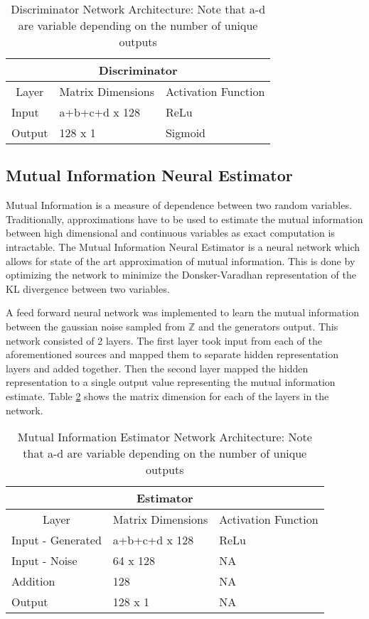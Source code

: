 \begin{table}[!htbp]
	\centering
	\label{tab:model_simple_b}
	\caption{Discriminator Network Architecture: Note that a-d are variable depending on the number of unique outputs}
	\begin{tabular}{l|l|l}
		\hline
		\multicolumn{3}{c}{\textbf{Discriminator}} \\ 
		\hline
		\multicolumn{1}{c|}{Layer} & \multicolumn{1}{c|}{Matrix Dimensions} & \multicolumn{1}{c}{Activation Function} \\ \hline
		Input & a+b+c+d x 128 & ReLu \\
		Output & 128 x 1 & Sigmoid \\
		\hline
	\end{tabular}
\end{table}


\subsection{Mutual Information Neural Estimator}
\label{sec:mine}
Mutual Information is a measure of dependence between two random variables. Traditionally, approximations have to be used to estimate the mutual information between high dimensional and continuous variables as exact computation is intractable. The Mutual Information Neural Estimator is a neural network which allows for state of the art approximation of mutual information. This is done by optimizing the network to minimize the Donsker-Varadhan representation of the KL divergence between two variables. 

A feed forward neural network was implemented to learn the mutual information between the gaussian noise sampled from $\mathbb{Z}$ and the generators output. This network consisted of 2 layers. The first layer took input from each of the aforementioned sources and mapped them to separate hidden representation layers and added together. Then the second layer mapped the hidden representation to a single output value representing the mutual information estimate. Table \ref{tab:model_mi} shows the matrix dimension for each of the layers in the network.

\begin{table}[!htbp]
	\centering
	\label{tab:model_mi}
	\caption{Mutual Information Estimator Network Architecture: Note that a-d are variable depending on the number of unique outputs}
	\begin{tabular}{l|l|l}
		\hline
		\multicolumn{3}{c}{\textbf{Estimator}} \\ 
		\hline
		\multicolumn{1}{c|}{Layer} & \multicolumn{1}{c|}{Matrix Dimensions} & \multicolumn{1}{c}{Activation Function} \\ \hline
		Input - Generated & a+b+c+d x 128 & ReLu \\
		Input - Noise & 64 x 128 & NA \\
		Addition & 128 & NA \\ 
		Output & 128 x 1 &  NA \\
		\hline
	\end{tabular}
\end{table}


